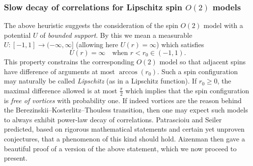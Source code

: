\documentclass[12pt,reqno]{article}
\begin{document}
\subsubsection{Slow decay of correlations for Lipschitz spin $O(2)$
models}\label{sec:Aizenman_slow_decay_of_correlations}

The above heuristic suggests the consideration of the spin $O(2)$ model with a potential $U$ of \emph{bounded support}. By this we mean a measurable $U:[-1,1]\to(-\infty,\infty]$ (allowing here $U(r) = \infty$) which satisfies
\begin{equation*}
  U(r) = \infty\quad\text{when $r<r_0\in(-1,1)$}.
\end{equation*}
This property constrains the corresponding $O(2)$ model so that
adjacent spins have difference of arguments at most $\arccos(r_0)$.
Such a spin configuration may naturally be called \emph{Lipschitz}
(as in a Lipschitz function). If $r_0\ge 0$, the maximal difference
allowed is at most $\frac{\pi}{2}$ which implies that the spin
configuration is \emph{free of vortices} with probability one. If
indeed vortices are the reason behind the
Berezinskii--Kosterlitz--Thouless transition, then one may expect such
models to always exhibit power-law decay of correlations.
Patrascioiu and Seiler \cite{PatSei92} predicted, based on rigorous
mathematical statements and certain yet unproven conjectures, that a
phenomenon of this kind should hold. Aizenman \cite{Aiz94} then
gave a beautiful proof of a version of the above statement, which we
now proceed to present.
\end{document}
